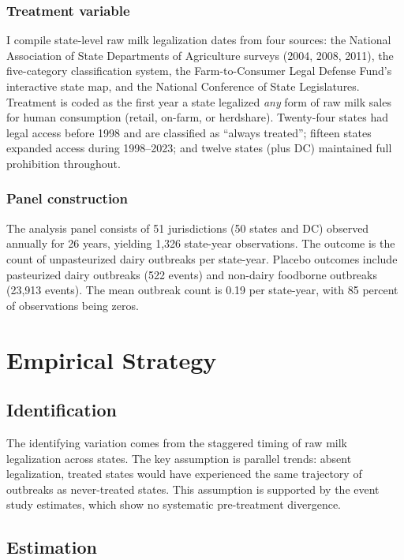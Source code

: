 \documentclass[12pt]{article}
\begin{document}
\subsubsection*{Treatment variable} I compile state-level raw milk legalization dates from four sources: the National Association of State Departments of Agriculture surveys (2004, 2008, 2011), the \citet{Whitten2022} five-category classification system, the Farm-to-Consumer Legal Defense Fund's interactive state map, and the National Conference of State Legislatures. Treatment is coded as the first year a state legalized \textit{any} form of raw milk sales for human consumption (retail, on-farm, or herdshare). Twenty-four states had legal access before 1998 and are classified as ``always treated''; fifteen states expanded access during 1998--2023; and twelve states (plus DC) maintained full prohibition throughout.

\subsubsection*{Panel construction} The analysis panel consists of 51 jurisdictions (50 states and DC) observed annually for 26 years, yielding 1,326 state-year observations. The outcome is the count of unpasteurized dairy outbreaks per state-year. Placebo outcomes include pasteurized dairy outbreaks (522 events) and non-dairy foodborne outbreaks (23,913 events). The mean outbreak count is 0.19 per state-year, with 85 percent of observations being zeros.




\section{Empirical Strategy}

\subsection{Identification}

The identifying variation comes from the staggered timing of raw milk legalization across states. The key assumption is parallel trends: absent legalization, treated states would have experienced the same trajectory of outbreaks as never-treated states. This assumption is supported by the event study estimates, which show no systematic pre-treatment divergence.

\subsection{Estimation}
\end{document}
